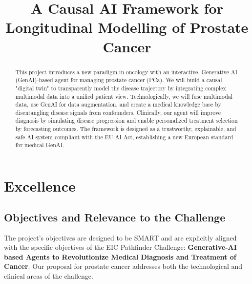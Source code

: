 \documentclass[11pt, a4paper]{article}
\title{A Causal AI Framework for Longitudinal Modelling of Prostate Cancer}
\author{}
\date{}
\begin{document}
\maketitle

\begin{abstract}
This project introduces a new paradigm in oncology with an interactive, Generative AI (GenAI)-based agent for managing prostate cancer (PCa). We will build a causal "digital twin" to transparently model the disease trajectory by integrating complex multimodal data into a unified patient view. Technologically, we will fuse multimodal data, use GenAI for data augmentation, and create a medical knowledge base by disentangling disease signals from confounders. Clinically, our agent will improve diagnosis by simulating disease progression and enable personalized treatment selection by forecasting outcomes. The framework is designed as a trustworthy, explainable, and safe AI system compliant with the EU AI Act, establishing a new European standard for medical GenAI.
\end{abstract}

\section{Excellence}

\subsection{Objectives and Relevance to the Challenge}
The project's objectives are designed to be SMART and are explicitly aligned with the specific objectives of the EIC Pathfinder Challenge: \textbf{Generative-AI based Agents to Revolutionize Medical Diagnosis and Treatment of Cancer}. Our proposal for prostate cancer addresses both the technological and clinical areas of the challenge.
\end{document}
